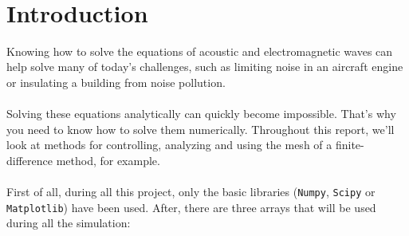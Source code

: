 \documentclass[a4paper]{article}
\begin{document}
\newcommand{\HRule}{\rule{\linewidth}{0.5mm}}



\thispagestyle{empty}


\tableofcontents
\thispagestyle{empty}


\renewcommand{\arraystretch}{1.5}


~
\thispagestyle{empty}
\newpage

\section{Introduction}

\hspace{0.8cm} Knowing how to solve the equations of acoustic and electromagnetic waves can help solve many of today's challenges, such as limiting noise in an aircraft engine or insulating a building from noise pollution.\\ \\
Solving these equations analytically can quickly become impossible. That's why you need to know how to solve them numerically. Throughout this report, we'll look at methods for controlling, analyzing and using the mesh of a finite-difference method, for example.\\ \\
First of all, during all this project, only the basic libraries (\texttt{Numpy}, \texttt{Scipy} or \texttt{Matplotlib}) have been used. After, there are three arrays that will be used during all the simulation:
\end{document}
